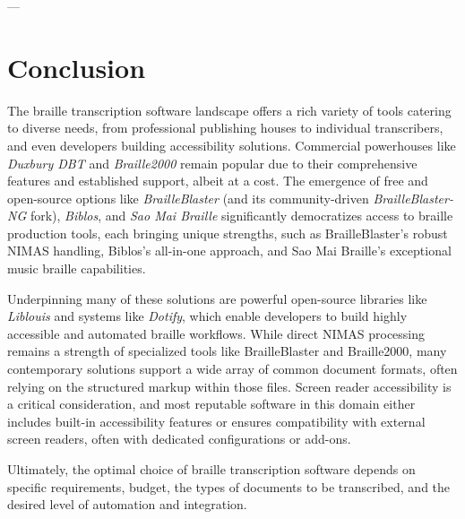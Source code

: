 ---

\section{Conclusion}
\label{sec:braille-conclusion}
The braille transcription software landscape offers a rich variety of tools catering to diverse needs, from professional publishing houses to individual transcribers, and even developers building accessibility solutions. Commercial powerhouses like \emph{Duxbury DBT} and \emph{Braille2000} remain popular due to their comprehensive features and established support, albeit at a cost. The emergence of free and open-source options like \emph{BrailleBlaster} (and its community-driven \emph{BrailleBlaster-NG} fork), \emph{Biblos}, and \emph{Sao Mai Braille} significantly democratizes access to braille production tools, each bringing unique strengths, such as BrailleBlaster's robust NIMAS handling, Biblos's all-in-one approach, and Sao Mai Braille's exceptional music braille capabilities.

Underpinning many of these solutions are powerful open-source libraries like \emph{Liblouis} and systems like \emph{Dotify}, which enable developers to build highly accessible and automated braille workflows. While direct NIMAS processing remains a strength of specialized tools like BrailleBlaster and Braille2000, many contemporary solutions support a wide array of common document formats, often relying on the structured markup within those files. Screen reader accessibility is a critical consideration, and most reputable software in this domain either includes built-in accessibility features or ensures compatibility with external screen readers, often with dedicated configurations or add-ons.

Ultimately, the optimal choice of braille transcription software depends on specific requirements, budget, the types of documents to be transcribed, and the desired level of automation and integration.

